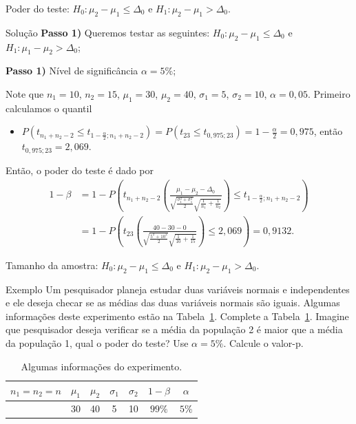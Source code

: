 \documentclass[9pt]{beamer}
\begin{document}
\begin{frame}{Poder do teste: $H_0: \mu_2 - \mu_1 \leq \Delta_0$ e $H_1: \mu_2 - \mu_1 > \Delta_0.$}

\begin{block}{Solução}
	\textbf{Passo 1)} Queremos testar as seguintes: $H_0: \mu_2 - \mu_1 \leq \Delta_0$ e $H_1: \mu_1 - \mu_2 > \Delta_0$;
	
	\textbf{Passo 1)} Nível de significância $\alpha=5\%$;
	
	Note que $n_1=10$, $n_2=15$, $\mu_1=30$, $\mu_2=40$, $\sigma_1=5$, $\sigma_2=10$, $\alpha = 0,05$. Primeiro calculamos o quantil
	\begin{itemize}
		\item $P(t_{n_1+n_2-2} \leq t_{1-\frac{\alpha}{2}; n_1+n_2-2}) = P(t_{23} \leq t_{0,975; 23}) = 1- \frac{\alpha}{2} = 0,975$, então $t_{0,975; 23} = 2,069$.
	\end{itemize}

	Então, o poder do teste é dado por
	\begin{align*}
		1- \beta &= 1 - P\left( t_{n_1 + n_2 -2}\left( \frac{ \mu_1 - \mu_2 - \Delta_0 }{\sqrt{\frac{\sigma_1^2 + \sigma_1^2}{2}} \sqrt{\frac{1}{n_1} + \frac{1}{n_2}}} \right) \leq t_{1-\frac{\alpha}{2};n_1 + n_2 -2} \right)\\
		&= 1 - P\left( t_{23}\left( \frac{ 40 - 30 - 0 }{\sqrt{\frac{5^2 + 10^2}{2}} \sqrt{\frac{1}{10} + \frac{1}{15}}} \right) \leq 2,069 \right)= 0,9132.
	\end{align*}
\end{block}
\end{frame}

\begin{frame}{Tamanho da amostra: $H_0: \mu_2 - \mu_1 \leq \Delta_0$ e $H_1: \mu_2 - \mu_1 > \Delta_0.$}

\begin{block}{Exemplo}
	Um pesquisador planeja estudar duas variáveis normais e independentes e ele deseja checar se as médias das duas variáveis normais são iguais. Algumas informações deste experimento estão na Tabela~\ref{tab:experimento-h1-upper-sample-size}. Complete a Tabela~\ref{tab:experimento-h1-upper-sample-size}. Imagine que pesquisador deseja verificar se a média da população 2 é maior que a média da população 1, qual o poder do teste? Use $\alpha=5\%$. Calcule o valor-p.
\end{block}

\begin{table}[htbp]
	\centering
	\begin{tabular}{c|c|c|c|c|c|c}
		\toprule[0.05cm]
		$n_1=n_2=n$ & $\mu_1$ & $\mu_2$ & $\sigma_1$ & $\sigma_2$ & $1-\beta$ & $\alpha$ \\ \midrule[0.025cm]
		 & 30 & 40 & 5 & 10 & $99\%$ & $5\%$ \\
		\bottomrule[0.05cm]
	\end{tabular}
	\caption{Algumas informações do experimento.}
	\label{tab:experimento-h1-upper-sample-size}
\end{table}
\end{frame}
\end{document}
